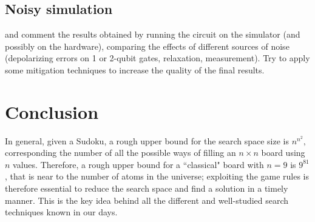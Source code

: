\documentclass{article}
\begin{document}
\subsection{Noisy simulation}
and comment the results obtained by running the circuit on the simulator (and
possibly on the hardware), comparing the effects of different sources of noise
(depolarizing errors on 1 or 2-qubit gates, relaxation, measurement). Try to
apply
some mitigation techniques to increase the quality of the final results.


\section{Conclusion}
In general, given a Sudoku, a rough upper bound for the search
space size is $n^{n^2},$ corresponding the number of all the possible ways
of filling an $n \times n$ board using $n$ values.
Therefore, a rough upper bound for a ``classical" board with $n=9$ is $9^{81}$,
that is near to the number of atoms in the universe;
exploiting the game rules is therefore essential to reduce the search space
and find a solution in a timely manner. This is the key idea behind all the
different and well-studied search techniques known in our days.
\end{document}
